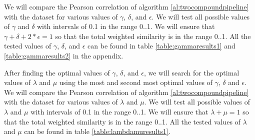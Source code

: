 \documentclass{article}
\begin{document}
We will compare the Pearson correlation of algorithm \ref{al:twocompoundpipeline} with the dataset for various values of $\gamma$, $\delta$, and $\epsilon$. We will test all possible values of $\gamma$ and $\delta$ with intervals of 0.1 in the range 0..1. We will ensure that $\gamma + \delta + 2 * \epsilon = 1$ so that the total weighted similarity is in the range 0..1. All the tested values of $\gamma$, $\delta$, and $\epsilon$ can be found in table \ref{table:gammaresults1} and \ref{table:gammaresults2} in the appendix. 

After finding the optimal values of $\gamma$, $\delta$, and $\epsilon$, we will search for the optimal values of $\lambda$ and $\mu$ using the most and second most optimal values of $\gamma$, $\delta$ and $\epsilon$. We will compare the Pearson correlation of algorithm \ref{al:twocompoundpipeline} with the dataset for various values of $\lambda$ and $\mu$. We will test all possible values of $\lambda$ and $\mu$ with intervals of 0.1 in the range 0..1. We will ensure that $\lambda + \mu = 1$ so that the total weighted similarity is in the range 0..1. All the tested values of $\lambda$ and $\mu$ can be found in table \ref{table:lambdamuresults1}.





\end{document}
